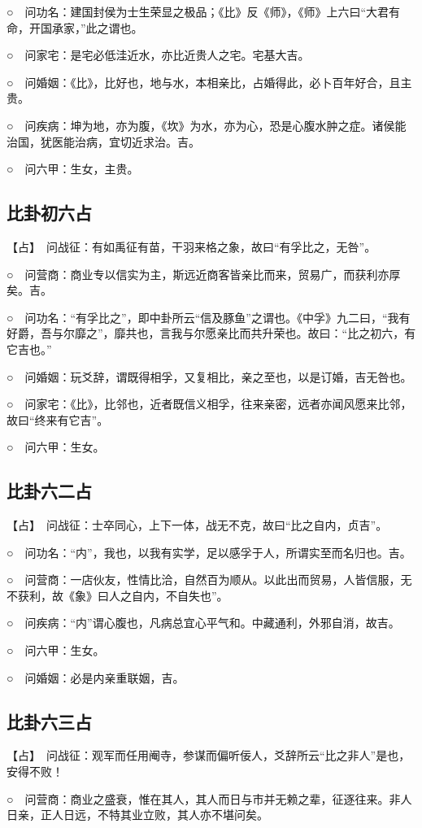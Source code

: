 \documentclass[12pt,oneside]{book}
\begin{document}
○　问功名：建国封侯为士生荣显之极品；《比》反《师》，《师》上六曰“大君有命，开国承家，”此之谓也。

○　问家宅：是宅必低洼近水，亦比近贵人之宅。宅基大吉。

○　问婚姻：《比》，比好也，地与水，本相亲比，占婚得此，必卜百年好合，且主贵。

○　问疾病：坤为地，亦为腹，《坎》为水，亦为心，恐是心腹水肿之症。诸侯能治国，犹医能治病，宜切近求治。吉。

○　问六甲：生女，主贵。

\subsection{比卦初六占}
【占】　问战征：有如禹征有苗，干羽来格之象，故曰“有孚比之，无咎”。

○　问营商：商业专以信实为主，斯远近商客皆亲比而来，贸易广，而获利亦厚矣。吉。

○　问功名：“有孚比之”，即中卦所云“信及豚鱼”之谓也。《中孚》九二曰，“我有好爵，吾与尔靡之”，靡共也，言我与尔愿亲比而共升荣也。故曰：“比之初六，有它吉也。”

○　问婚姻：玩爻辞，谓既得相孚，又复相比，亲之至也，以是订婚，吉无咎也。

○　问家宅：《比》，比邻也，近者既信义相孚，往来亲密，远者亦闻风愿来比邻，故曰“终来有它吉”。

○　问六甲：生女。
\subsection{比卦六二占}
【占】　问战征：士卒同心，上下一体，战无不克，故曰“比之自内，贞吉”。

○　问功名：“内”，我也，以我有实学，足以感孚于人，所谓实至而名归也。吉。

○　问营商：一店伙友，性情比洽，自然百为顺从。以此出而贸易，人皆信服，无不获利，故《象》曰人之自内，不自失也”。

○　问疾病：“内”谓心腹也，凡病总宜心平气和。中藏通利，外邪自消，故吉。

○　问六甲：生女。

○　问婚姻：必是内亲重联姻，吉。
\subsection{比卦六三占}
【占】　问战征：观军而任用阉寺，参谋而偏听佞人，爻辞所云“比之非人”是也，安得不败！

○　问营商：商业之盛衰，惟在其人，其人而日与市并无赖之辈，征逐往来。非人日亲，正人日远，不特其业立败，其人亦不堪问矣。
\end{document}
